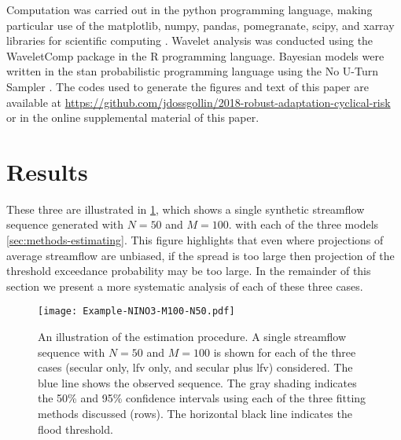 \documentclass[
  draft,
  linenumbers
]{agujournal2019}
\begin{document}
Computation was carried out in the python programming language, making particular use of the matplotlib, numpy, pandas, pomegranate, scipy, and xarray libraries for scientific computing \citep{Hunter:2007ih, vanderWalt:2011dp, McKinney:2010un, schreiber:2017, Jones:2001uv, Hoyer:2017hs}.
Wavelet analysis was conducted using the WaveletComp package \citep{Roesch:wlBQQoIs} in the R programming language.
Bayesian models were written in the stan probabilistic programming language \citep{Carpenter:2017ke} using the No U-Turn Sampler \citep{Hoffman:2011wm,Betancourt:2017vd}.
The codes used to generate the figures and text of this paper are available at \url{https://github.com/jdossgollin/2018-robust-adaptation-cyclical-risk} or in the online supplemental material of this paper.


\section{Results}\label{sec:results}

These three  are illustrated in \cref{fig:example-fit}, which shows a single synthetic streamflow sequence generated with $N=50$ and $M=100$.
 with each of the three  models  \cref{sec:methods-estimating}.
This figure highlights that even where projections of average streamflow are unbiased, if the spread is too large then projection of the threshold exceedance probability may be too large.
In the remainder of this section we present a more systematic analysis of each of these three cases.

\begin{figure}
  \texttt{[image: Example-NINO3-M100-N50.pdf]}
  \caption{
    An illustration of the estimation procedure.
    A single streamflow sequence with $N=50$ and $M=100$ is shown for each of the three cases (secular only, \gls{lfv} only, and secular plus \gls{lfv}) considered.
    The blue line shows the observed sequence.
    The gray shading indicates the 50\% and 95\% confidence intervals using each of the three fitting methods discussed (rows).
    The horizontal black line indicates the flood threshold.
  }\label{fig:example-fit}
\end{figure}
\end{document}

